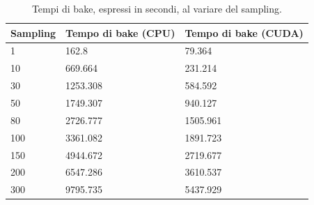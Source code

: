 \begin{table}[]
\centering
\caption[Performance al variare del sampling]{Tempi di bake, espressi in secondi, al variare del sampling.}
\begin{tabular}{|l|l|l|}
\hline
\textbf{Sampling} & \textbf{Tempo di bake (CPU)} & \textbf{Tempo di bake (CUDA)} \\ \hline
1 & 162.8 & 79.364 \\ \hline
10 & 669.664 & 231.214 \\ \hline
30 & 1253.308 & 584.592 \\ \hline
50 & 1749.307 & 940.127 \\ \hline
80 & 2726.777 & 1505.961 \\ \hline
100 & 3361.082 & 1891.723 \\ \hline
150 & 4944.672 & 2719.677 \\ \hline
200 & 6547.286 & 3610.537 \\ \hline
300 & 9795.735 & 5437.929 \\ \hline
\end{tabular}
\label{table:per_samp}
\end{table}


